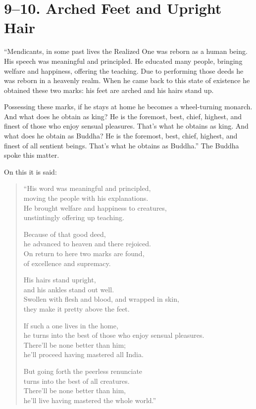 \documentclass[12pt,openany]{book}%
\begin{document}
\section*{9–10. Arched Feet and Upright Hair }

“Mendicants, in some past lives the Realized One was reborn as a human being. His speech was meaningful and principled. He educated many people, bringing welfare and happiness, offering the teaching. Due to performing those deeds he was reborn in a heavenly realm. When he came back to this state of existence he obtained these two marks: his feet are arched and his hairs stand up. 

Possessing these marks, if he stays at home he becomes a wheel-turning monarch. And what does he obtain as king? He is the foremost, best, chief, highest, and finest of those who enjoy sensual pleasures. That’s what he obtains as king. And what does he obtain as Buddha? He is the foremost, best, chief, highest, and finest of all sentient beings. That’s what he obtains as Buddha.” The Buddha spoke this matter. 

On this it is said: 

\begin{verse}%
“His word was meaningful and principled, \\
moving the people with his explanations. \\
He brought welfare and happiness to creatures, \\
unstintingly offering up teaching. 

Because of that good deed, \\
he advanced to heaven and there rejoiced. \\
On return to here two marks are found, \\
of excellence and supremacy. 

His hairs stand upright, \\
and his ankles stand out well. \\
Swollen with flesh and blood, and wrapped in skin, \\
they make it pretty above the feet. 

If such a one lives in the home, \\
he turns into the best of those who enjoy sensual pleasures. \\
There’ll be none better than him; \\
he’ll proceed having mastered all India. 

But going forth the peerless renunciate \\
turns into the best of all creatures. \\
There’ll be none better than him, \\
he’ll live having mastered the whole world.” 

%
\end{verse}
\end{document}
